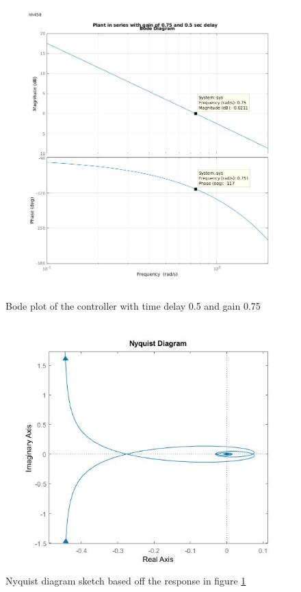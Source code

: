\documentclass[twoside,twocolumn]{article}
\begin{document}
\begin{figure}[h]
  \centering
    \includegraphics[width=\linewidth]{2_zoomed_in_bode}
  \caption{Bode plot of the controller with time delay 0.5 and gain 0.75 }
  \label{fig:2bode}
\end{figure}

\begin{figure}[h]
  \centering
    \includegraphics[width=\linewidth]{2_nyquist}
  \caption{Nyquist diagram sketch based off the response in figure \ref{fig:2bode} }
  \label{fig:2nyquist}
\end{figure}
\end{document}
